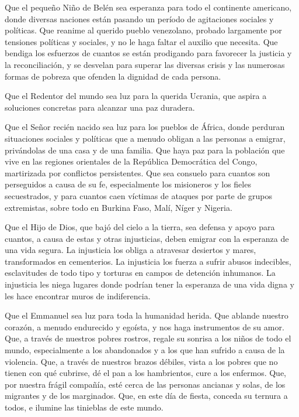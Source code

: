 Que el pequeño Niño de Belén sea esperanza para todo el continente americano, donde diversas naciones están pasando un período de agitaciones sociales y políticas. Que reanime al querido pueblo venezolano, probado largamente por tensiones políticas y sociales, y no le haga faltar el auxilio que necesita. Que bendiga los esfuerzos de cuantos se están prodigando para favorecer la justicia y la reconciliación, y se desvelan para superar las diversas crisis y las numerosas formas de pobreza que ofenden la dignidad de cada persona.

Que el Redentor del mundo sea luz para la querida Ucrania, que aspira a soluciones concretas para alcanzar una paz duradera.

Que el Señor recién nacido sea luz para los pueblos de África, donde perduran situaciones sociales y políticas que a menudo obligan a las personas a emigrar, privándolas de una casa y de una familia. Que haya paz para la población que vive en las regiones orientales de la República Democrática del Congo, martirizada por conflictos persistentes. Que sea consuelo para cuantos son perseguidos a causa de su fe, especialmente los misioneros y los fieles secuestrados, y para cuantos caen víctimas de ataques por parte de grupos extremistas, sobre todo en Burkina Faso, Malí, Níger y Nigeria.

Que el Hijo de Dios, que bajó del cielo a la tierra, sea defensa y apoyo para cuantos, a causa de estas y otras injusticias, deben emigrar con la esperanza de una vida segura. La injusticia los obliga a atravesar desiertos y mares, transformados en cementerios. La injusticia los fuerza a sufrir abusos indecibles, esclavitudes de todo tipo y torturas en campos de detención inhumanos. La injusticia les niega lugares donde podrían tener la esperanza de una vida digna y les hace encontrar muros de indiferencia.

Que el Emmanuel sea luz para toda la humanidad herida. Que ablande nuestro corazón, a menudo endurecido y egoísta, y nos haga instrumentos de su amor. Que, a través de nuestros pobres rostros, regale su sonrisa a los niños de todo el mundo, especialmente a los abandonados y a los que han sufrido a causa de la violencia. Que, a través de nuestros brazos débiles, vista a los pobres que no tienen con qué cubrirse, dé el pan a los hambrientos, cure a los enfermos. Que, por nuestra frágil compañía, esté cerca de las personas ancianas y solas, de los migrantes y de los marginados. Que, en este día de fiesta, conceda su ternura a todos, e ilumine las tinieblas de este mundo.

